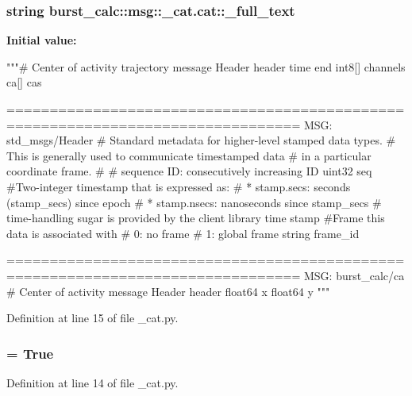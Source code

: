 \subsubsection[{\-\_\-full\-\_\-text}]{\setlength{\rightskip}{0pt plus 5cm}string {\bf burst\-\_\-calc\-::msg\-::\-\_\-cat.\-cat\-::\-\_\-full\-\_\-text}\hspace{0.3cm}{\ttfamily  [static, private]}}\label{classburst__calc_1_1msg_1_1__cat_1_1cat_ad0217d00a6e74cf0f6d7d99ba0283ec7}
{\bfseries \-Initial value\-:}
\begin{DoxyCode}
"""# Center of activity trajectory message
Header header
time end
int8[] channels
ca[] cas

      ================================================================================
MSG: std_msgs/Header
# Standard metadata for higher-level stamped data types.
# This is generally used to communicate timestamped data 
# in a particular coordinate frame.
# 
# sequence ID: consecutively increasing ID 
uint32 seq
#Two-integer timestamp that is expressed as:
# * stamp.secs: seconds (stamp_secs) since epoch
# * stamp.nsecs: nanoseconds since stamp_secs
# time-handling sugar is provided by the client library
time stamp
#Frame this data is associated with
# 0: no frame
# 1: global frame
string frame_id


      ================================================================================
MSG: burst_calc/ca
# Center of activity message
Header header
float64 x
float64 y 
"""
\end{DoxyCode}


\-Definition at line 15 of file \-\_\-cat.\-py.

\subsubsection[{\-\_\-has\-\_\-header}]{ = \-True\hspace{0.3cm}{\ttfamily  [static, private]}}\label{classburst__calc_1_1msg_1_1__cat_1_1cat_a04308f9965cc377435e926656ddbfe9c}


\-Definition at line 14 of file \-\_\-cat.\-py.

